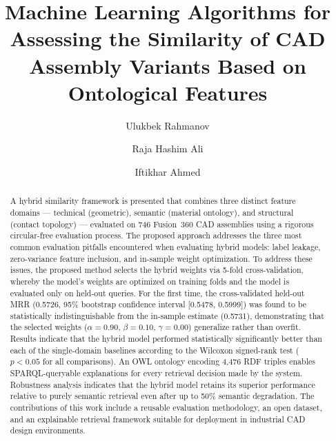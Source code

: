\documentclass[preprint,12pt]{elsarticle}
\begin{document}
\begin{frontmatter}

\title{Machine Learning Algorithms for Assessing the Similarity of CAD Assembly Variants Based on Ontological Features}

\author[label1]{Ulukbek Rahmanov}
\author[label1,label2]{Raja Hashim Ali}
\author[label1]{Iftikhar Ahmed}



\begin{abstract}
A hybrid similarity framework is presented that combines three distinct feature domains --- technical (geometric), semantic (material ontology), and structural (contact topology) --- evaluated on 746 Fusion~360 CAD assemblies using a rigorous circular-free evaluation process.
The proposed approach addresses the three most common evaluation pitfalls encountered when evaluating hybrid models: label leakage, zero-variance feature inclusion, and in-sample weight optimization.
To address these issues, the proposed method selects the hybrid weights via 5-fold cross-validation, whereby the model's weights are optimized on training folds and the model is evaluated only on held-out queries.
For the first time, the cross-validated held-out MRR (0.5726, 95\% bootstrap confidence interval [0.5478, 0.5999]) was found to be statistically indistinguishable from the in-sample estimate (0.5731), demonstrating that the selected weights ($\alpha{=}0.90$, $\beta{=}0.10$, $\gamma{=}0.00$) generalize rather than overfit.
Results indicate that the hybrid model performed statistically significantly better than each of the single-domain baselines according to the Wilcoxon signed-rank test ($p < 0.05$ for all comparisons).
An OWL ontology encoding 4,476 RDF triples enables SPARQL-queryable explanations for every retrieval decision made by the system.
Robustness analysis indicates that the hybrid model retains its superior performance relative to purely semantic retrieval even after up to 50\% semantic degradation.
The contributions of this work include a reusable evaluation methodology, an open dataset, and an explainable retrieval framework suitable for deployment in industrial CAD design environments.
\end{abstract}


\end{frontmatter}
\end{document}
